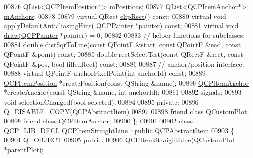 \begin{DoxyCode}
\hypertarget{a00116_source_l00876}{}\hyperlink{a00022_af94ff71b6a15ea6d028ab8bd8eccd012}{00876}   QList<QCPItemPosition*> \hyperlink{a00022_af94ff71b6a15ea6d028ab8bd8eccd012}{mPositions};
\hypertarget{a00116_source_l00877}{}\hyperlink{a00022_a909a3abab783de302ebf0a0e6f2bbc15}{00877}   QList<QCPItemAnchor*> \hyperlink{a00022_a909a3abab783de302ebf0a0e6f2bbc15}{mAnchors};
00878   
00879   \textcolor{keyword}{virtual} QRect \hyperlink{a00044_a07a8f746640c3704b09910df297afcba}{clipRect}() \textcolor{keyword}{const};
00880   \textcolor{keyword}{virtual} \textcolor{keywordtype}{void} \hyperlink{a00044_afdf83ddc6a265cbf4c89fe99d3d93473}{applyDefaultAntialiasingHint}(
      \hyperlink{a00047}{QCPPainter} *painter) \textcolor{keyword}{const};
00881   \textcolor{keyword}{virtual} \textcolor{keywordtype}{void} \hyperlink{a00044_aecf2f7087482d4b6a78cb2770e5ed12d}{draw}(\hyperlink{a00047}{QCPPainter} *painter) = 0;
00882   
00883   \textcolor{comment}{// helper functions for subclasses:}
00884   \textcolor{keywordtype}{double} distSqrToLine(\textcolor{keyword}{const} QPointF &start, \textcolor{keyword}{const} QPointF &end, \textcolor{keyword}{const} QPointF &point) \textcolor{keyword}{const};
00885   \textcolor{keywordtype}{double} rectSelectTest(\textcolor{keyword}{const} QRectF &rect, \textcolor{keyword}{const} QPointF &pos, \textcolor{keywordtype}{bool} filledRect) \textcolor{keyword}{const};
00886   
00887   \textcolor{comment}{// anchor/position interface:}
00888   \textcolor{keyword}{virtual} QPointF anchorPixelPoint(\textcolor{keywordtype}{int} anchorId) \textcolor{keyword}{const};
00889   \hyperlink{a00038}{QCPItemPosition} *createPosition(\textcolor{keyword}{const} QString &name);
00890   \hyperlink{a00032}{QCPItemAnchor} *createAnchor(\textcolor{keyword}{const} QString &name, \textcolor{keywordtype}{int} anchorId);
00891   
00892 signals:
00893   \textcolor{keywordtype}{void} selectionChanged(\textcolor{keywordtype}{bool} selected);
00894   
00895 \textcolor{keyword}{private}:
00896   Q\_DISABLE\_COPY(\hyperlink{a00022}{QCPAbstractItem})
00897   
00898   friend class QCustomPlot;
\hypertarget{a00116_source_l00899}{}\hyperlink{a00022_a61767d414fd57af9eb1741b34268c7fc}{00899}   friend class \hyperlink{a00032}{QCPItemAnchor};
00900 \};
00901 
\hypertarget{a00116_source_l00902}{}\hyperlink{a00040}{00902} class \hyperlink{a00116_a5eaab02224a642ded7fb8951e973a02c}{QCP\_LIB\_DECL} \hyperlink{a00040}{QCPItemStraightLine} : public 
      \hyperlink{a00022}{QCPAbstractItem}
00903 \{
00904   Q\_OBJECT
00905 \textcolor{keyword}{public}:
00906   \hyperlink{a00040}{QCPItemStraightLine}(QCustomPlot *parentPlot);

\end{DoxyCode}
